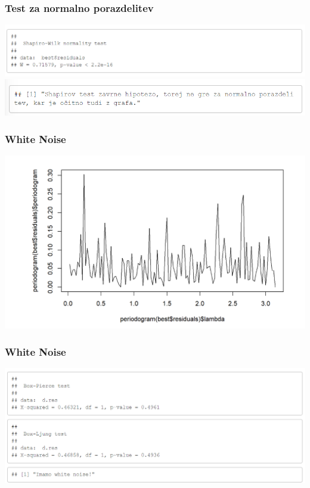 \documentclass[10pt]{beamer}
\begin{document}
\begin{frame}
\frametitle{Test za normalno porazdelitev}
\includegraphics[width=1\textwidth]{ShapiroB.png}
\includegraphics[width=1\textwidth]{ninormalnaB.png}

\end{frame}

\begin{frame}
\frametitle{White Noise}
\includegraphics[width=1\textwidth]{white_noiseB.png}
\end{frame}

\begin{frame}
\frametitle{White Noise}
\includegraphics[width=1\textwidth]{testwnB.png}
\end{frame}
\end{document}
